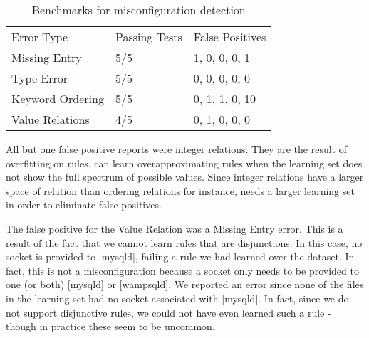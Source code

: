 \begin{table}[t]
\centering
\caption{Benchmarks for misconfiguration detection}
\label{table:res}
\begin{tabular}{l|l|l}
Error Type       & Passing Tests & False Positives  \\ \hhline{|=|=|=|}
Missing Entry    & 5/5           & 1, 0, 0, 0, 1        \\ \hline
Type Error       & 5/5           & 0, 0, 0, 0, 0          \\ \hline
Keyword Ordering & 5/5           & 0, 1, 1, 0, 10       \\ \hline
Value Relations  & 4/5           & 0, 1, 0, 0, 0        \\ 
\end{tabular}
\end{table}

All but one false positive reports were integer relations. They are the result of overfitting on rules.
\app can learn overapproximating rules when the learning set does not show the full spectrum of possible values.
Since integer relations have a larger space of relation than ordering relations for instance, \app needs a larger learning set in order to eliminate false positives.

The false positive for the Value Relation was a Missing Entry error.
This is a result of the fact that we cannot learn rules that are disjunctions.
In this case, no socket is provided to [mysqld], failing a rule we had learned over the dataset.
In fact, this is not a misconfiguration because a socket only needs to be provided to one (or both) [mysqld] or [wampsqld].
We reported an error since none of the files in the learning set had no socket associated with [mysqld].
In fact, since we do not support disjunctive rules, we could not have even learned such a rule - though in practice these seem to be uncommon.

